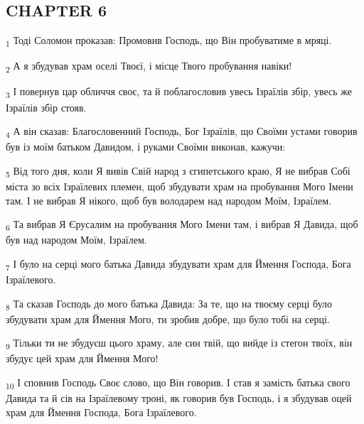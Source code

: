 \subsection{CHAPTER 6}
\begin{tcolorbox}
\textsubscript{1} Тоді Соломон проказав: Промовив Господь, що Він пробуватиме в мряці.
\end{tcolorbox}
\begin{tcolorbox}
\textsubscript{2} А я збудував храм оселі Твоєї, і місце Твого пробування навіки!
\end{tcolorbox}
\begin{tcolorbox}
\textsubscript{3} І повернув цар обличчя своє, та й поблагословив увесь Ізраїлів збір, увесь же Ізраїлів збір стояв.
\end{tcolorbox}
\begin{tcolorbox}
\textsubscript{4} А він сказав: Благословенний Господь, Бог Ізраїлів, що Своїми устами говорив був із моїм батьком Давидом, і руками Своїми виконав, кажучи:
\end{tcolorbox}
\begin{tcolorbox}
\textsubscript{5} Від того дня, коли Я вивів Свій народ з єгипетського краю, Я не вибрав Собі міста зо всіх Ізраїлевих племен, щоб збудувати храм на пробування Мого Імени там. І не вибрав Я нікого, щоб був володарем над народом Моїм, Ізраїлем.
\end{tcolorbox}
\begin{tcolorbox}
\textsubscript{6} Та вибрав Я Єрусалим на пробування Мого Імени там, і вибрав Я Давида, щоб був над народом Моїм, Ізраїлем.
\end{tcolorbox}
\begin{tcolorbox}
\textsubscript{7} І було на серці мого батька Давида збудувати храм для Ймення Господа, Бога Ізраїлевого.
\end{tcolorbox}
\begin{tcolorbox}
\textsubscript{8} Та сказав Господь до мого батька Давида: За те, що на твоєму серці було збудувати храм для Ймення Мого, ти зробив добре, що було тобі на серці.
\end{tcolorbox}
\begin{tcolorbox}
\textsubscript{9} Тільки ти не збудуєш цього храму, але син твій, що вийде із стегон твоїх, він збудує цей храм для Ймення Мого!
\end{tcolorbox}
\begin{tcolorbox}
\textsubscript{10} І сповнив Господь Своє слово, що Він говорив. І став я замість батька свого Давида та й сів на Ізраїлевому троні, як говорив був Господь, і я збудував оцей храм для Ймення Господа, Бога Ізраїлевого.
\end{tcolorbox}
